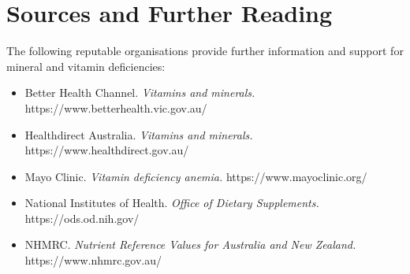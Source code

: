 \section*{Sources and Further Reading}
The following reputable organisations provide further information and support for mineral and vitamin deficiencies:
\begin{itemize}
    \item Better Health Channel. \textit{Vitamins and minerals.} https://www.betterhealth.vic.gov.au/
    \item Healthdirect Australia. \textit{Vitamins and minerals.} https://www.healthdirect.gov.au/
    \item Mayo Clinic. \textit{Vitamin deficiency anemia.} https://www.mayoclinic.org/
    \item National Institutes of Health. \textit{Office of Dietary Supplements.} https://ods.od.nih.gov/
    \item NHMRC. \textit{Nutrient Reference Values for Australia and New Zealand.} https://www.nhmrc.gov.au/
\end{itemize}
